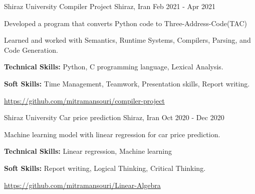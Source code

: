 

\begin{cventries}

  \cventry
    {Shiraz University} %
    {Compiler Project} %
    {Shiraz, Iran} %
    {Feb 2021 - Apr 2021} %
    {
      \begin{cvitems} %
        \item {Developed a program that converts Python code to Three-Address-Code(TAC)}
        \item {Learned and worked with Semantics, Runtime Systems, Compilers, Parsing, and Code Generation.}
        \item {\textbf{Technical Skills:} Python, C programming language, Lexical Analysis.}
        \item {\textbf{Soft Skills:} Time Management, Teamwork, Presentation skills, Report writing.}
        \item {\hyperlink{Link:}{https://github.com/mitramansouri/compiler-project}}
      \end{cvitems}
    }

  \cventry
    {Shiraz University} %
    {Car price prediction} %
    {Shiraz, Iran} %
    {Oct 2020 - Dec 2020} %
    {
      \begin{cvitems} %
        \item {Machine learning model with linear regression for car price prediction.}
        \item {\textbf{Technical Skills:} Linear regression, Machine learning}
        \item {\textbf{Soft Skills:} Report writing, Logical Thinking, Critical Thinking.}
        \item {\hyperlink{Link:}{https://github.com/mitramansouri/Linear-Algebra}}
      \end{cvitems}
    }


\end{cventries}
